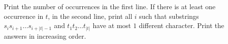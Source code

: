 Print the number of occurrences in the first line.
If there is at least one occurrence in $t$, in the second line, print all $i$ such that substrings $s_is_{i+1}\ldots s_{i+|t|-1}$ and $t_1t_2\ldots t_{|t|}$ have at most $1$ different character.
Print the answers in increasing order.